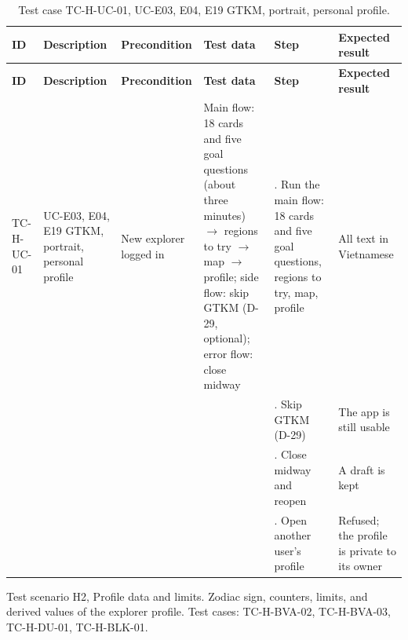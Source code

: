 {\footnotesize{}\renewcommand{\arraystretch}{1.1}
\begin{longtable}{|>{\raggedright\arraybackslash}p{}|>{\raggedright\arraybackslash}p{}|>{\raggedright\arraybackslash}p{}|>{\raggedright\arraybackslash}p{}|>{\raggedright\arraybackslash}p{}|>{\raggedright\arraybackslash}p{}|}
\caption{Test case TC-H-UC-01, UC-E03, E04, E19 GTKM, portrait, personal profile.} \\
\hline
\textbf{ID} & \textbf{Description} & \textbf{Precondition} & \textbf{Test data} & \textbf{Step} & \textbf{Expected result} \\ \hline
\endfirsthead
\hline
\textbf{ID} & \textbf{Description} & \textbf{Precondition} & \textbf{Test data} & \textbf{Step} & \textbf{Expected result} \\ \hline
\endhead
TC-H-UC-01 & UC-E03, E04, E19 GTKM, portrait, personal profile & New explorer logged in & Main flow: 18 cards and five goal questions (about three minutes) $\rightarrow$ regions to try $\rightarrow$ map $\rightarrow$ profile; side flow: skip GTKM (D-29, optional); error flow: close midway & 1. Run the main flow: 18 cards and five goal questions, regions to try, map, profile & All text in Vietnamese \\ \cline{5-6}
 &  &  &  & 2. Skip GTKM (D-29) & The app is still usable \\ \cline{5-6}
 &  &  &  & 3. Close midway and reopen & A draft is kept \\ \cline{5-6}
 &  &  &  & 4. Open another user's profile & Refused; the profile is private to its owner \\ \hline
\end{longtable}
}

Test scenario H2, Profile data and limits. Zodiac sign, counters, limits, and derived values of the explorer profile. Test cases: TC-\allowbreak{}H-\allowbreak{}BVA-\allowbreak{}02, TC-\allowbreak{}H-\allowbreak{}BVA-\allowbreak{}03, TC-H-DU-01, TC-\allowbreak{}H-\allowbreak{}BLK-\allowbreak{}01.

